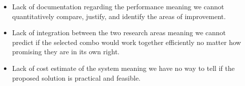\documentclass[../thesis.tex]{subfiles}
\begin{document}
\begin{itemize}
	\item Lack of documentation regarding the performance meaning we cannot quantitatively compare, justify, and identify the areas of improvement. 
	\item Lack of integration between the two research areas meaning we cannot predict if the selected combo would work together efficiently no matter how promising they are in its own right. 
	\item Lack of cost estimate of the system meaning we have no way to tell if the proposed solution is practical and feasible. 
\end{itemize}
\end{document}

